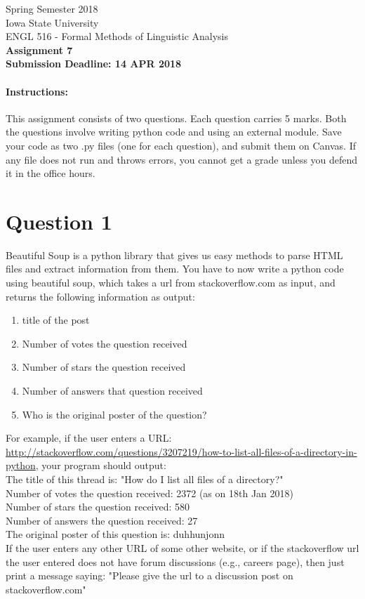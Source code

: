 \documentclass[11pt,a4paper]{article}
\begin{document}
\begin{center}
  Spring Semester 2018 \\ Iowa State University\\[3ex]
  {\large ENGL 516 - Formal Methods of Linguistic Analysis}\\[3ex]
  \textbf{Assignment 7} \\ \textbf{Submission Deadline: 14 APR 2018}
\end{center}


\paragraph{Instructions:} This assignment consists of two questions. Each question carries 5 marks. Both the questions involve writing python code and using an external module. Save your code as two .py files (one for each question), and submit them on Canvas. If any file does not run and throws errors, you cannot get a grade unless you defend it in the office hours. 

\section*{Question 1}
Beautiful Soup is a python library that gives us easy methods to parse HTML files and extract information from them. You have to now write a python code using beautiful soup, which takes a url from stackoverflow.com as input, and returns the following information as output:
\begin{enumerate}
\item title of the post
\item Number of votes the question received
\item Number of stars the question received
\item Number of answers that question received
\item Who is the original poster of the question?
\end{enumerate}
For example, if the user enters a URL: \url{http://stackoverflow.com/questions/3207219/how-to-list-all-files-of-a-directory-in-python}, your program should output:
\\ The title of this thread is: "How do I list all files of a directory?"
\\ Number of votes the question received: 2372 (as on 18th Jan 2018)
\\ Number of stars the question received: 580
\\ Number of answers the question received: 27
\\ The original poster of this question is: duhhunjonn \\
If the user enters any other URL of some other website, or if the stackoverflow url the user entered does not have forum discussions (e.g., careers page), then just print a message saying: "Please give the url to a discussion post on stackoverflow.com"
\end{document}
